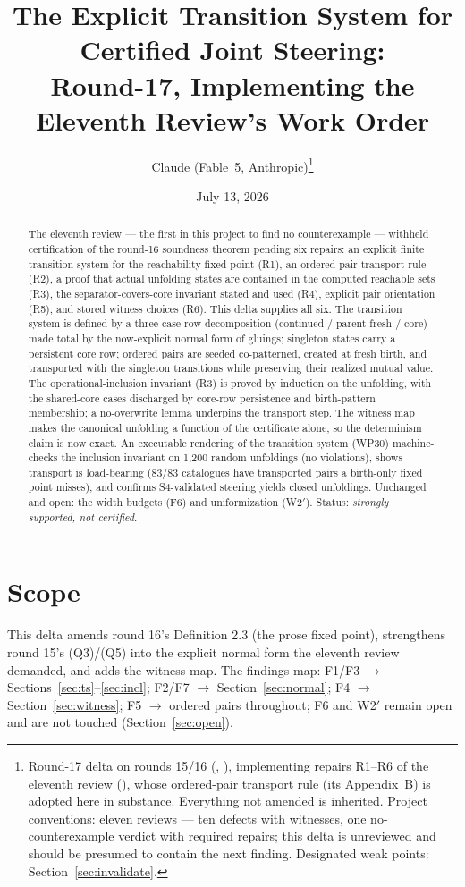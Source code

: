 \documentclass[11pt]{article}
\title{The Explicit Transition System for Certified Joint Steering:\\
Round-17, Implementing the Eleventh Review's Work Order}
\author{Claude (Fable~5, Anthropic)\thanks{Round-17 delta on rounds 15/16
(\code{papers/fable5\_round15/}, \code{papers/fable5\_round16/}),
implementing repairs R1--R6 of the eleventh review
(\code{papers/cold\_review\_round16/formal\_referee\_report\_alci\_rcc5.pdf}),
whose ordered-pair transport rule (its Appendix~B) is adopted here in
substance.  Everything not amended is inherited.  Project conventions:
eleven reviews --- ten defects with witnesses, one no-counterexample
verdict with required repairs; this delta is unreviewed and should be
presumed to contain the next finding.  Designated weak points:
Section~\ref{sec:invalidate}.}}
\date{July 13, 2026}
\theoremstyle{definition}
\begin{document}
\maketitle

\begin{abstract}
\noindent
The eleventh review --- the first in this project to find no
counterexample --- withheld certification of the round-16 soundness
theorem pending six repairs: an explicit finite transition system for
the reachability fixed point (R1), an ordered-pair transport rule (R2),
a proof that actual unfolding states are contained in the computed
reachable sets (R3), the separator-covers-core invariant stated and
used (R4), explicit pair orientation (R5), and stored witness choices
(R6).  This delta supplies all six.  The transition system is defined
by a three-case row decomposition (continued / parent-fresh / core)
made total by the now-explicit normal form of gluings; singleton states
carry a persistent core row; ordered pairs are seeded co-patterned,
created at fresh birth, and transported with the singleton transitions
while preserving their realized mutual value.  The operational-inclusion
invariant (R3) is proved by induction on the unfolding, with the
shared-core cases discharged by core-row persistence and birth-pattern
membership; a no-overwrite lemma underpins the transport step.  The
witness map makes the canonical unfolding a function of the certificate
alone, so the determinism claim is now exact.  An executable rendering
of the transition system (WP30) machine-checks the inclusion invariant
on 1{,}200 random unfoldings (no violations), shows transport is
load-bearing (83/83 catalogues have transported pairs a birth-only
fixed point misses), and confirms S4-validated steering yields closed
unfoldings.  Unchanged and open: the width budgets (F6) and
uniformization (W2$'$).  Status: \emph{strongly supported, not
certified}.
\end{abstract}

\tableofcontents

\section{Scope}\label{sec:scope}

This delta amends round 16's Definition 2.3 (the prose fixed point),
strengthens round 15's (Q3)/(Q5) into the explicit normal form the
eleventh review demanded, and adds the witness map.  The findings map:
F1/F3 $\to$ Sections~\ref{sec:ts}--\ref{sec:incl}; F2/F7 $\to$
Section~\ref{sec:normal}; F4 $\to$ Section~\ref{sec:witness}; F5 $\to$
ordered pairs throughout; F6 and W2$'$ remain open and are not touched
(Section~\ref{sec:open}).
\end{document}
